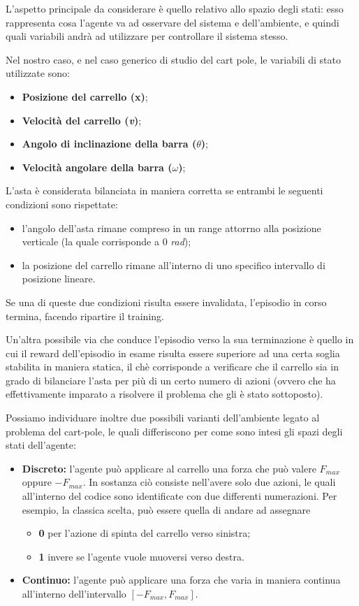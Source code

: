 L'aspetto principale da considerare è quello relativo allo spazio degli stati: esso rappresenta cosa l'agente va ad osservare del sistema e dell'ambiente, e quindi quali variabili andrà ad utilizzare per controllare il sistema stesso. 

Nel nostro caso, e nel caso generico di studio del cart pole, le variabili di stato utilizzate sono:
\begin{itemize}
	\item \textbf{Posizione del carrello (x)};
	\item \textbf{Velocità del carrello (\textit{v})};
	\item \textbf{Angolo di inclinazione della barra ($\theta$)};
	\item \textbf{Velocità angolare della barra ($\omega$)};
\end{itemize}

\newpage
L'asta è considerata bilanciata in maniera corretta se entrambi le seguenti condizioni sono rispettate:
\begin{itemize}
	\item l'angolo dell'asta rimane compreso in un range attorrno alla posizione verticale (la quale corrisponde a 0 \textit{rad});
	\item la posizione del carrello rimane all'interno di uno specifico intervallo di posizione lineare.
\end{itemize}
Se una di queste due condizioni risulta essere invalidata, l'episodio in corso termina, facendo ripartire il training.

Un'altra possibile via che conduce l'episodio verso la sua terminazione è quello in cui il reward dell'episodio in esame risulta essere superiore ad una certa soglia stabilita in maniera statica, il chè corrisponde a verificare che il carrello sia in grado di bilanciare l'asta per più di un certo numero di azioni (ovvero che ha effettivamente imparato a risolvere il problema che gli è stato sottoposto).

Possiamo individuare inoltre due possibili varianti dell'ambiente legato al problema del cart-pole, le quali differiscono per come sono intesi gli spazi degli stati dell'agente:
\begin{itemize}
	\item \textbf{Discreto:} l'agente può applicare al carrello una forza che può valere \textbf{$F_{max}$} 
	oppure \textbf{$-F_{max}$}. In sostanza ciò consiste nell'avere solo due azioni, le quali all'interno del codice sono identificate con due differenti numerazioni. 
	Per esempio, la classica scelta, può essere quella di andare ad assegnare
	\begin{itemize}
		\item  \textbf{0} per l'azione di spinta del carrello verso sinistra;
		\item  \textbf{1} invere se l'agente vuole muoversi verso destra.
	\end{itemize}
	\item \textbf{Continuo:} l'agente può applicare una forza che varia in maniera continua\\ all'interno dell'intervallo $[-F_{max}, F_{max}]$.
\end{itemize}

